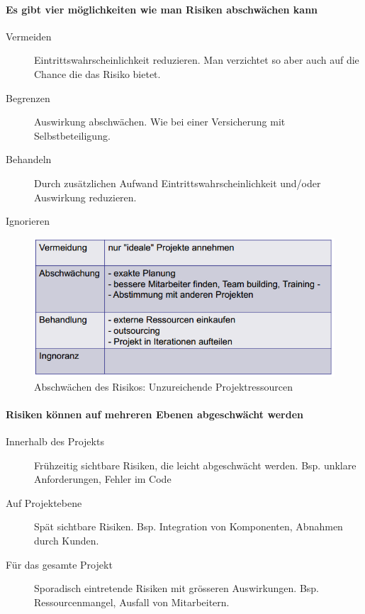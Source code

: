 \paragraph{Es gibt vier möglichkeiten wie man Risiken abschwächen kann}
\begin{description}
	\item[Vermeiden] Eintrittswahrscheinlichkeit reduzieren. Man verzichtet so aber auch auf die Chance die das Risiko bietet.
	\item[Begrenzen] Auswirkung abschwächen. Wie bei einer Versicherung mit Selbstbeteiligung.
	\item[Behandeln] Durch zusätzlichen Aufwand Eintrittswahrscheinlichkeit und/oder Auswirkung reduzieren.
	\item[Ignorieren]
\end{description}

\begin{figure}[h!]
\centering
\includegraphics[width=0.7\linewidth]{fig/risiko-management-beispiel-abschwaechen-risiko}
\caption{Abschwächen des Risikos: Unzureichende Projektressourcen}
\label{fig:risiko-management-beispiel-abschwaechen-risiko}
\end{figure}

\paragraph{Risiken können auf mehreren Ebenen abgeschwächt werden}
\begin{description}
	\item[Innerhalb des Projekts] Frühzeitig sichtbare Risiken, die leicht abgeschwächt werden. Bsp. unklare Anforderungen, Fehler im Code
	\item[Auf Projektebene] Spät sichtbare Risiken. Bsp. Integration von Komponenten, Abnahmen durch Kunden.
	\item[Für das gesamte Projekt] Sporadisch eintretende Risiken mit grösseren Auswirkungen. Bsp. Ressourcenmangel, Ausfall von Mitarbeitern.
\end{description}

